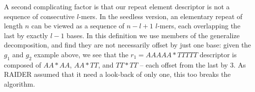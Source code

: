 \documentclass{bmcart}
\begin{document}
A second complicating factor is that our repeat element descriptor is
not a sequence of consecutive $l$-mers. In the seedless version, an
elementary repeat of length $n$ can be viewed as a sequence of $n-l+1$
$l$-mers, each overlapping the last by exactly $l-1$ bases. In this
definition we use members of the generalize decomposition, and find
they are not necessarily offset by just one base: given the $g_1$ and
$g_2$ example above, we see that the $r_1 = AAAAA*TTTTT$ descriptor is
composed of $AA*AA$, $AA*TT$, and $TT*TT$ -- each offset from the last
by 3.  As RAIDER assumed that it need a look-back of only one, this
too breaks the algorithm.

  
    









\end{document}
